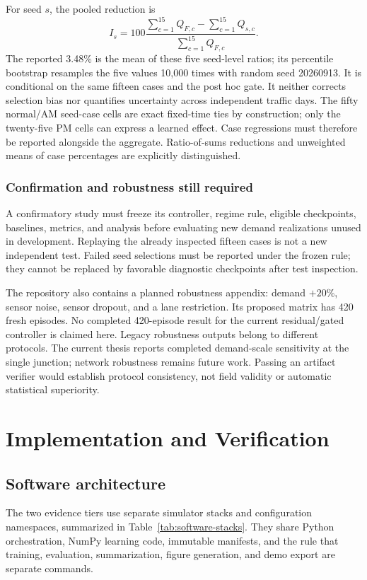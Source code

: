 \documentclass[12pt,a4paper]{report}
\begin{document}
For seed $s$, the pooled reduction is
\begin{equation}
I_s=100\frac{\sum_{c=1}^{15}Q_{F,c}-\sum_{c=1}^{15}Q_{s,c}}
{\sum_{c=1}^{15}Q_{F,c}}.
\end{equation}
The reported 3.48\% is the mean of these five seed-level ratios; its percentile bootstrap resamples the five values 10,000 times with random seed 20260913. It is conditional on the same fifteen cases and the post hoc gate. It neither corrects selection bias nor quantifies uncertainty across independent traffic days. The fifty normal/AM seed-case cells are exact fixed-time ties by construction; only the twenty-five PM cells can express a learned effect. Case regressions must therefore be reported alongside the aggregate. Ratio-of-sums reductions and unweighted means of case percentages are explicitly distinguished.

\subsection{Confirmation and robustness still required}
A confirmatory study must freeze its controller, regime rule, eligible checkpoints, baselines, metrics, and analysis before evaluating new demand realizations unused in development. Replaying the already inspected fifteen cases is not a new independent test. Failed seed selections must be reported under the frozen rule; they cannot be replaced by favorable diagnostic checkpoints after test inspection.

The repository also contains a planned robustness appendix: demand $+20\%$, sensor noise, sensor dropout, and a lane restriction. Its proposed matrix has 420 fresh episodes. No completed 420-episode result for the current residual/gated controller is claimed here. Legacy robustness outputs belong to different protocols. The current thesis reports completed demand-scale sensitivity at the single junction; network robustness remains future work. Passing an artifact verifier would establish protocol consistency, not field validity or automatic statistical superiority.

\chapter{Implementation and Verification}\label{ch:implementation}

\section{Software architecture}
The two evidence tiers use separate simulator stacks and configuration namespaces, summarized in Table~\ref{tab:software-stacks}. They share Python orchestration, NumPy learning code, immutable manifests, and the rule that training, evaluation, summarization, figure generation, and demo export are separate commands.
\end{document}
